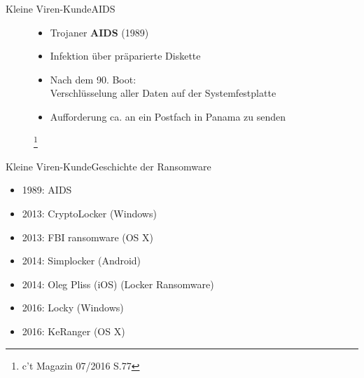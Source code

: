 \documentclass[10pt]{beamer}
\begin{document}
\begin{frame}{Kleine Viren-Kunde}{AIDS}
	\begin{figure}[p]
		\begin{itemize}
			\item Trojaner \textbf{AIDS} (1989)
			\item Infektion über präparierte Diskette
			\item Nach dem 90. Boot: \\ Verschlüsselung aller Daten auf der Systemfestplatte
			\item Aufforderung ca.  an ein Postfach in Panama zu senden
		\end{itemize}
		\let\thefootnote\relax\footnote{c't Magazin 07/2016 S.77}
	\end{figure}
\end{frame}

\begin{frame}{Kleine Viren-Kunde}{Geschichte der Ransomware}
	\begin{itemize}
		\item<1-> 1989: AIDS
		\item<2-> 2013: CryptoLocker (Windows)
		\item<3-> 2013: FBI ransomware (OS X)
		\item<4-> 2014: Simplocker (Android)
		\item<4-> 2014: Oleg Pliss (iOS) (Locker Ransomware)
		\item<5-> 2016: Locky (Windows)
		\item<5-> 2016: KeRanger (OS X)
	\end{itemize}
\end{frame}
\end{document}
